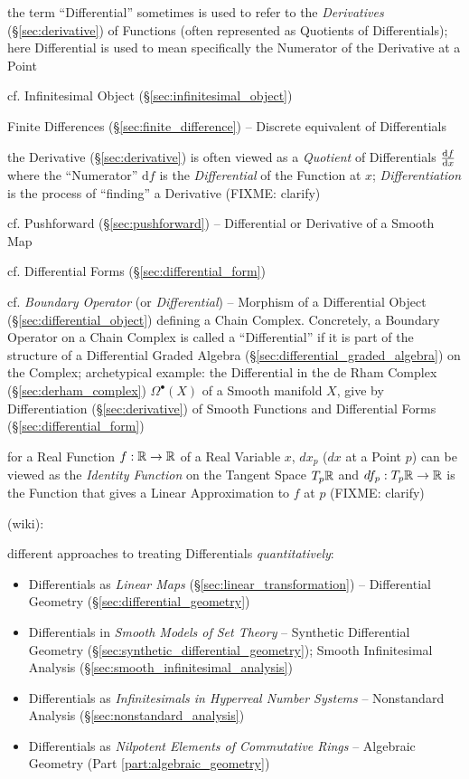 the term ``Differential'' sometimes is used to refer to the \emph{Derivatives}
(\S\ref{sec:derivative}) of Functions (often represented as Quotients of
Differentials); here Differential is used to mean specifically the Numerator of
the Derivative at a Point

\fist cf. Infinitesimal Object (\S\ref{sec:infinitesimal_object})

\fist Finite Differences (\S\ref{sec:finite_difference}) -- Discrete equivalent
of Differentials

\fist the Derivative (\S\ref{sec:derivative}) is often viewed as a
\emph{Quotient} of Differentials $\frac{\mathrm{d}f}{\mathrm{d}x}$ where the ``Numerator''
$\mathrm{d}f$ is the \emph{Differential} of the Function at $x$;
\emph{Differentiation} is the process of ``finding'' a Derivative (FIXME:
clarify)

\fist cf. Pushforward (\S\ref{sec:pushforward}) -- Differential or Derivative of
a Smooth Map

\fist cf. Differential Forms (\S\ref{sec:differential_form})

\fist cf. \emph{Boundary Operator} (or \emph{Differential}) -- Morphism of a
Differential Object (\S\ref{sec:differential_object}) defining a Chain Complex.
Concretely, a Boundary Operator on a Chain Complex is called a ``Differential''
if it is part of the structure of a Differential Graded Algebra
(\S\ref{sec:differential_graded_algebra}) on the Complex; archetypical example:
the Differential in the de Rham Complex (\S\ref{sec:derham_complex})
$\Omega^\bullet(X)$ of a Smooth manifold $X$, give by Differentiation
(\S\ref{sec:derivative}) of Smooth Functions and Differential Forms
(\S\ref{sec:differential_form})

for a Real Function $f : \mathbb{R} \rightarrow \mathbb{R}$ of a Real Variable $x$,
$dx_p$ ($dx$ at a Point $p$) can be viewed as the \emph{Identity Function} on
the Tangent Space $T_p\mathbb{R}$ and $df_p : T_p\mathbb{R} \rightarrow \mathbb{R}$ is the
Function that gives a Linear Approximation to $f$ at $p$ (FIXME: clarify)

(wiki):

different approaches to treating Differentials \emph{quantitatively}:
\begin{itemize}
  \item Differentials as \emph{Linear Maps} (\S\ref{sec:linear_transformation})
    -- Differential Geometry (\S\ref{sec:differential_geometry})
  \item Differentials in \emph{Smooth Models of Set Theory} -- Synthetic
    Differential Geometry (\S\ref{sec:synthetic_differential_geometry}); Smooth
    Infinitesimal Analysis (\S\ref{sec:smooth_infinitesimal_analysis})
  \item Differentials as \emph{Infinitesimals in Hyperreal Number Systems} --
    Nonstandard Analysis (\S\ref{sec:nonstandard_analysis})
  \item Differentials as \emph{Nilpotent Elements of Commutative Rings} --
    Algebraic Geometry (Part \ref{part:algebraic_geometry})
\end{itemize}

